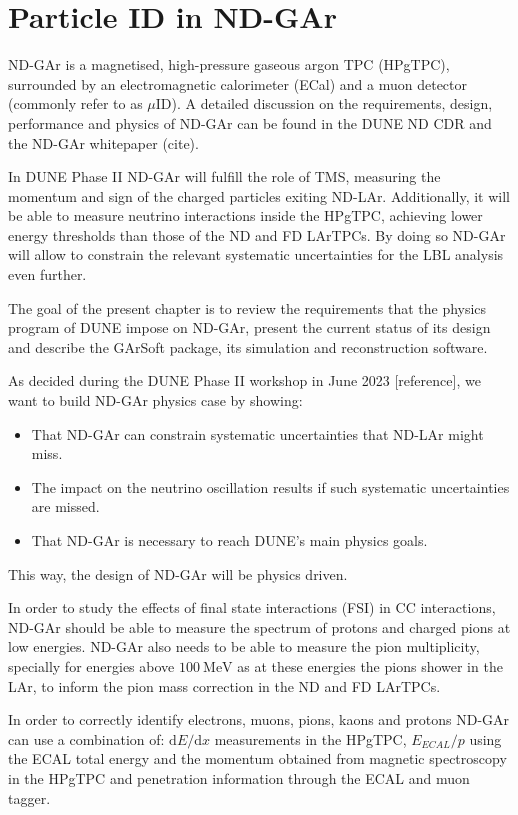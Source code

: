 \chapter{Particle ID in ND-GAr}
\label{chapter:garsoft_pid}

ND-GAr is a magnetised, high-pressure gaseous argon TPC (HPgTPC), surrounded by an electromagnetic calorimeter (ECal) and a muon detector (commonly refer to as $\mu$ID). A detailed discussion on the requirements, design, performance and physics of ND-GAr can be found in the DUNE ND CDR \cite{DUNE2021NDCDR} and the ND-GAr whitepaper (cite).

In DUNE Phase II ND-GAr will fulfill the role of TMS, measuring the momentum and sign of the charged particles exiting ND-LAr. Additionally, it will be able to measure neutrino interactions inside the HPgTPC, achieving lower energy thresholds than those of the ND and FD LArTPCs. By doing so ND-GAr will allow to constrain the relevant systematic uncertainties for the LBL analysis even further.

The goal of the present chapter is to review the requirements that the physics program of DUNE impose on ND-GAr, present the current status of its design and describe the GArSoft package, its simulation and reconstruction software.

As decided during the DUNE Phase II workshop in June 2023 [reference], we want to build ND-GAr physics case by showing:
\begin{itemize}
    \item That ND-GAr can constrain systematic uncertainties that ND-LAr might miss.
    \item The impact on the neutrino oscillation results if such systematic uncertainties are missed.
    \item That ND-GAr is necessary to reach DUNE's main physics goals.
\end{itemize}

This way, the design of ND-GAr will be physics driven.

In order to study the effects of final state interactions (FSI) in CC interactions, ND-GAr should be able to measure the spectrum of protons and charged pions at low energies. ND-GAr also needs to be able to measure the pion multiplicity, specially for energies above $100~\mathrm{MeV}$ as at these energies the pions shower in the LAr, to inform the pion mass correction in the ND and FD LArTPCs.

In order to correctly identify electrons, muons, pions, kaons and protons ND-GAr can use a combination of: $\mathrm{d}E/\mathrm{d}x$ measurements in the HPgTPC, $E_{ECAL}/p$ using the ECAL total energy and the momentum obtained from magnetic spectroscopy in the HPgTPC and penetration information through the ECAL and muon tagger.


